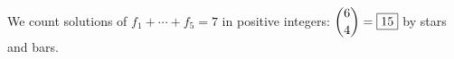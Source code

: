 We count solutions of $f_1+\cdots+f_5=7$ in positive integers: $\dbinom{6}{4}=\boxed{15}$ by stars and bars.
